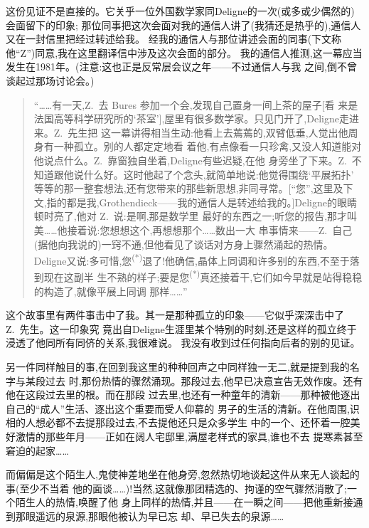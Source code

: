 这份见证不是直接的。它关乎一位外国数学家同Deligne的一次(或多或少偶然的)会面留下的印象;
那位同事把这次会面对我的通信人讲了(我猜还是热乎的),通信人又在一封信里把经过转述给我。
经我的通信人与那位讲述会面的同事(下文称他“Z”)同意,我在这里翻译信中涉及这次会面的部分。
我的通信人推测,这一幕应当发生在1981年。(注意:这也正是反常层会议之年——不过通信人与我
之间,倒不曾谈起过那场讨论会。)

\begin{quote}
\pmark{}“……有一天,Z.~去 Bures 参加一个会,发现自己置身一间上茶的屋子[看
来是法国高等科学研究所的‘茶室’],屋里有很多数学家。只见门开了,Deligne走进来。Z.~先生把
这一幕讲得相当生动:他看上去蔫蔫的,双臂低垂,人觉出他周身有一种孤立。别的人都定定地看
着他,有点像看一只珍禽,又没人知道能对他说点什么。Z.~靠窗独自坐着,Deligne有些迟疑,在他
身旁坐了下来。Z.~不知道跟他说什么好。这时他起了个念头,就简单地说:他觉得围绕‘平展拓扑’
等等的那一整套想法,还有您带来的那些新思想,非同寻常。[“您”,这里及下文,指的都是我,Grothendieck——我的通信人是转述给我的。]Deligne的眼睛顿时亮了,他对 Z.~说:是啊,那是数学里
最好的东西之一;听您的报告,那才叫美……他接着说:您想想这个,再想想那个……数出一大
串事情来——Z.~自己(据他向我说的)一窍不通,但他看见了谈话对方身上骤然涌起的热情。Deligne又说:多可惜,您\textsuperscript{(*)}退了!他确信,晶体上同调和许多别的东西,不至于落到现在这副半
生不熟的样子;要是您\textsuperscript{(*)}真还接着干,它们如今早就是站得稳稳的构造了,就像平展上同调
那样……”
\end{quote}

这个故事里有两件事击中了我。其一是那种孤立的印象——它似乎深深击中了 Z.~先生。这一印象究
竟出自Deligne生涯里某个特别的时刻,还是这样的孤立终于浸透了他同所有同侪的关系,我很难说。
我没有收到过任何指向后者的别的见证。

另一件同样触目的事,在回到我这里的种种回声之中同样独一无二,就是提到我的名字与某段过去
时,那份热情的骤然涌现。那段过去,他早已决意宣告无效作废。还有他在这段过去里的根。而在那段
过去里,也还有一种童年的清新——那种被他逐出自己的“成人”生活、\dmark{}逐出这个重要而受人仰慕的
男子的生活的清新。在他周围,识相的人想必都不去提那段过去,不去提他还只是众多学生
中的一个、还怀着一腔美好激情的那些年月——正如在阔人宅邸里,满屋老样式的家具,谁也不去
提寒素甚至窘迫的起家……

而偏偏是这个陌生人,鬼使神差地坐在他身旁,忽然热切地谈起这件从来无人谈起的事(至少不当着
他的面谈……)!当然,这就像那团精选的、拘谨的空气骤然消散了;一个陌生人的热情,唤醒了他
身上同样的热情,并且——在一瞬之间——把他重新接通到那眼遥远的泉源,那眼他被认为早已忘
却、早已失去的泉源……
